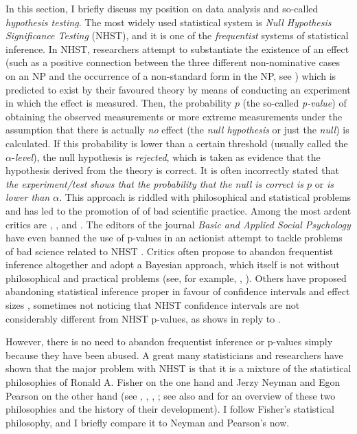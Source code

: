 In this section, I briefly discuss my position on data analysis and so-called \textit{hypothesis testing}.
The most widely used statistical system is \textit{Null Hypothesis Significance Testing} (NHST), and it is one of the \textit{frequentist} systems of statistical inference.
In NHST, researchers attempt to substantiate the existence of an effect (such as a positive connection between the three different non-nominative cases on an NP and the occurrence of a non-standard form in the NP, see \RAWeakN) which is predicted to exist by their favoured theory by means of conducting an experiment in which the effect is measured.
Then, the probability $p$ (the so-called \textit{p-value}) of obtaining the observed measurements or more extreme measurements under the assumption that there is actually \textit{no} effect (the \textit{null hypothesis} or just the \textit{null}) is calculated.
If this probability is lower than a certain threshold (usually called the $\alpha$-\textit{level}), the null hypothesis is \textit{rejected}, which is taken as evidence that the hypothesis derived from the theory is correct.
It is often incorrectly stated that \textit{the experiment\slash test shows that the probability that the null is correct is $p$} or \textit{is lower than $\alpha$}.
This approach is riddled with philosophical and statistical problems and has led to the promotion of of bad scientific practice.
Among the most ardent critics are \citet{Gigerenzer2004}, \citet{Colquhoun2014}, and \citet{MunafoEa2017}.
The editors of the journal \textit{Basic and Applied Social Psychology} have even banned the use of p-values in an actionist attempt to tackle problems of bad science related to NHST \citep{TrafimowMarks2016}.
Critics often propose to abandon frequentist inference altogether and adopt a Bayesian approach, which itself is not without philosophical and practical problems (see, for example, \citealt{Mayo1996}, \citealt{Senn2011}).
Others have proposed abandoning statistical inference proper in favour of confidence intervals and effect sizes \citep{Cumming2014}, sometimes not noticing that NHST confidence intervals are not considerably different from NHST p-values, as \citet{Perezgonzalez2015b} shows in reply to \citet{Cumming2014}.

However, there is no need to abandon frequentist inference or p-values simply because they have been abused.
A great many statisticians and researchers have shown that the major problem with NHST is that it is a mixture of the statistical philosophies of Ronald A. Fisher on the one hand and Jerzy Neyman and Egon Pearson on the other hand (see \citealt{Goodman2008}, \citealt{Perezgonzalez2014}, \citealt{Perezgonzalez2015}, \citealt{GreenlandEa2016}; see also \citealt{Lehmann1993} and \citealt{Lehmann2011} for an overview of these two philosophies and the history of their development).
I follow Fisher's statistical philosophy, and I briefly compare it to Neyman and Pearson's now.

